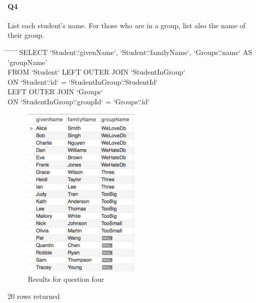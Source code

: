 \documentclass[paper=a4, fontsize=11pt]{scrartcl} %
\numberwithin{equation}{section} %
\numberwithin{figure}{section} %
\numberwithin{table}{section} %
\begin{document}
    \paragraph{Q4}List each student's name. For those who are in a group, list also the name of their group.
    \begin{center}
        \begin{minipage}{10cm}
        \begin{tabbing}
            \hspace*{.25in} \= \hspace*{.25in} \= \hspace*{.25in} \= \hspace*{.25in} \= \hspace*{.25in} \=\kill
            {\color{blue}SELECT `Student`.`givenName`, `Student`.`familyName`, `Groups`.`name` AS 'groupName'}\\
            \> {\color{blue}FROM `Student` LEFT OUTER JOIN `StudentInGroup`} \\
            \> {\color{blue}ON `Student`.`id` = `StudentInGroup`.`StudentId`}\\
            \> {\color{blue} LEFT OUTER JOIN `Groups` }\\
            \> {\color{blue}ON `StudentInGroup`.`groupId` = `Groups`.`id`}
        
        \end{tabbing}
        \end{minipage}
    \end{center}
    \begin{figure}[htbp!]
        \centering
        \includegraphics[width=0.5\textwidth]{q42.png}
        \caption{Results for question four}%
        \vspace{-1em}
    \end{figure}
    {\color{red} 20 rows returned}
    \newpage
\end{document}
